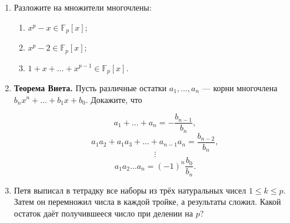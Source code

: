 \documentclass{article}
\begin{document}
\begin{enumerate}[label*=\protect\fbox{\arabic{enumi}}]
\item  Разложите на множители многочлены: 
\begin{enumerate}
	\item $x^p - x \in \mathbb{F}_p[x]$;
	\item $x^{p} - 2 \in \mathbb{F}_p[x]$; 
	\item $1 + x + \ldots + x^{p-1} \in \mathbb{F}_p[x]$.
\end{enumerate}

\item \textbf{Теорема Виета.} Пусть различные остатки $a_1, \ldots, a_n$ — корни многочлена $b_n x^n + \ldots + b_1 x + b_0$. Докажите, что

$$a_1 + \ldots + a_n = - \frac{b_{n-1}}{b_n},$$
$$a_1 a_2 + a_1 a_3 + \ldots + a_{n-1} a_n = \frac{b_{n-2}}{b_n},$$
$$\vdots$$
$$a_1 a_2 \ldots a_n = (-1)^n \frac{b_0}{b_n}.$$

\item Петя выписал в тетрадку все наборы из трёх натуральных чисел $1 \leq k \leq p$. Затем он перемножил числа в каждой тройке, а результаты сложил. Какой остаток даёт получившееся число при делении на $p$?

\end{enumerate}
\end{document}
